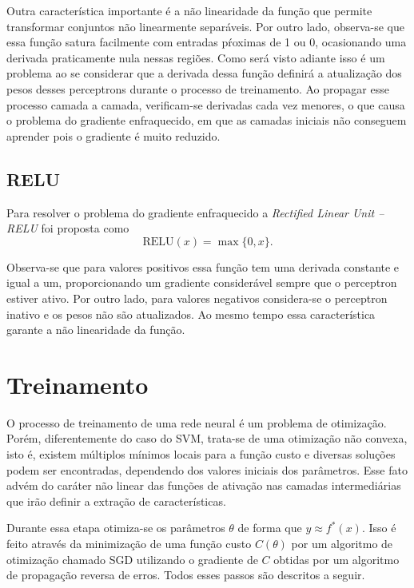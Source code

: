Outra característica importante é a não linearidade da função que permite transformar conjuntos não linearmente separáveis. Por outro lado, observa-se que essa função satura facilmente com entradas pŕoximas de 1 ou 0, ocasionando uma derivada praticamente nula nessas regiões. Como será visto adiante isso é um problema ao se considerar que a derivada dessa função definirá a atualização dos pesos desses perceptrons durante o processo de treinamento. Ao propagar esse processo camada a camada, verificam-se derivadas cada vez menores, o que causa o problema do gradiente enfraquecido, em que as camadas iniciais não conseguem aprender pois o gradiente é muito reduzido.

\subsection{RELU}
Para resolver o problema do gradiente enfraquecido a \textit{Rectified Linear Unit -- RELU} foi proposta \cite{nair2010relu} como
\begin{equation}
	\label{eq:relu}
	\text{RELU}(x) = \max\{0,x\}.
\end{equation}

Observa-se que para valores positivos essa função tem uma derivada constante e igual a um, proporcionando um gradiente considerável sempre que o perceptron estiver ativo. Por outro lado, para valores negativos considera-se o perceptron inativo e os pesos não são atualizados. Ao mesmo tempo essa característica garante a não linearidade da função.

\section{Treinamento}
O processo de treinamento de uma rede neural é um problema de otimização. Porém, diferentemente do caso do SVM, trata-se de uma otimização não convexa, isto é, existem múltiplos mínimos locais para a função custo e diversas soluções podem ser encontradas, dependendo dos valores iniciais dos parâmetros. Esse fato advém do caráter não linear das funções de ativação nas camadas intermediárias que irão definir a extração de características.

Durante essa etapa otimiza-se os parâmetros $\theta$ de forma que $y \approx f^*(x)$. Isso é feito através da minimização de uma função custo $C(\theta)$ por um algoritmo de otimização chamado SGD utilizando o gradiente de $C$ obtidas por um algoritmo de propagação reversa de erros. Todos esses passos são descritos a seguir.

